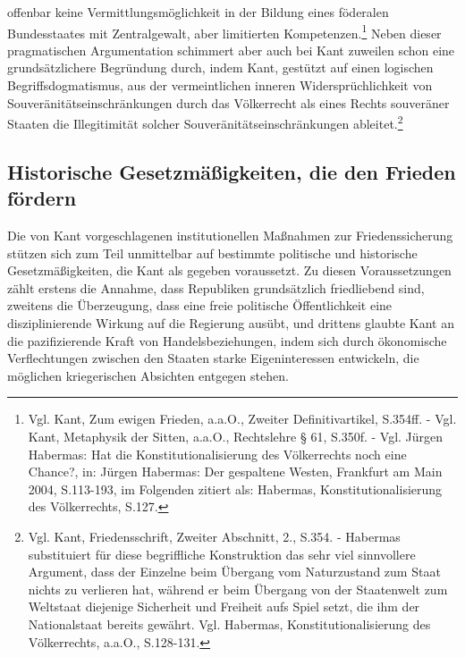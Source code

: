\documentclass[12pt,a4paper,ngerman]{article}
\begin{document}
offenbar keine Vermittlungsmöglichkeit in der Bildung eines föderalen
Bundesstaates mit Zentralgewalt, aber limitierten
Kompetenzen.\footnote{Vgl. Kant, Zum ewigen Frieden, a.a.O., Zweiter
  Definitivartikel, S.354ff. - Vgl. Kant, Metaphysik der Sitten,
  a.a.O., Rechtslehre § 61, S.350f.  - Vgl. Jürgen Habermas: Hat die
  Konstitutionalisierung des Völkerrechts noch eine Chance?, in:
  Jürgen Habermas: Der gespaltene Westen, Frankfurt am Main 2004,
  S.113-193, im Folgenden zitiert als: Habermas,
  Konstitutionalisierung des Völkerrechts, S.127.}  Neben dieser
pragmatischen Argumentation schimmert aber auch bei Kant zuweilen
schon eine grundsätzlichere Begründung durch, indem Kant, gestützt auf
einen logischen Begriffsdogmatismus, aus der vermeintlichen inneren
Widersprüchlichkeit von Souveränitätseinschränkungen durch das
Völkerrecht als eines Rechts souveräner Staaten die Illegitimität
solcher Souveränitätseinschränkungen ableitet.\footnote{Vgl. Kant,
  Friedensschrift, Zweiter Abschnitt, 2., S.354. - Habermas
  substituiert für diese begriffliche Konstruktion das sehr viel
  sinnvollere Argument, dass der Einzelne beim Übergang vom
  Naturzustand zum Staat nichts zu verlieren hat, während er beim
  Übergang von der Staatenwelt zum Weltstaat diejenige Sicherheit und
  Freiheit aufs Spiel setzt, die ihm der Nationalstaat bereits
  gewährt. Vgl. Habermas, Konstitutionalisierung des Völkerrechts,
  a.a.O., S.128-131.}


\subsection{Historische Gesetzmäßigkeiten, die den Frieden fördern}

Die von Kant vorgeschlagenen institutionellen Maßnahmen zur
Friedenssicherung stützen sich zum Teil unmittelbar auf bestimmte
politische und historische Gesetzmäßigkeiten, die Kant als gegeben
voraussetzt. Zu diesen Voraussetzungen zählt erstens die Annahme,
dass Republiken grundsätzlich friedliebend sind, zweitens die
Überzeugung, dass eine freie politische Öffentlichkeit eine
disziplinierende Wirkung auf die Regierung ausübt, und drittens
glaubte Kant an die pazifizierende Kraft von Handelsbeziehungen, indem
sich durch ökonomische Verflechtungen zwischen den Staaten starke
Eigeninteressen entwickeln, die möglichen kriegerischen Absichten
entgegen stehen.
\end{document}
